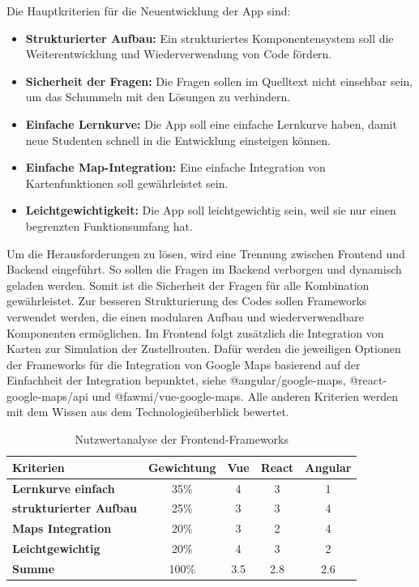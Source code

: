\documentclass[biblatex]{lni}
\begin{document}
Die Hauptkriterien für die Neuentwicklung der App sind:
\begin{itemize}
  \item \textbf{Strukturierter Aufbau:} Ein strukturiertes Komponentensystem soll die Weiterentwicklung und Wiederverwendung von Code fördern.
  \item \textbf{Sicherheit der Fragen:} Die Fragen sollen im Quelltext nicht einsehbar sein, um das Schummeln mit den Lösungen zu verhindern.
  \item \textbf{Einfache Lernkurve:} Die App soll eine einfache Lernkurve haben, damit neue Studenten schnell in die Entwicklung einsteigen können.
  \item \textbf{Einfache Map-Integration:} Eine einfache Integration von Kartenfunktionen soll gewährleistet sein.
  \item \textbf{Leichtgewichtigkeit:} Die App soll leichtgewichtig sein, weil sie nur einen begrenzten Funktionsumfang hat.
\end{itemize}

Um die Herausforderungen zu lösen, wird eine Trennung zwischen Frontend und Backend eingeführt.
So sollen die Fragen im Backend verborgen und dynamisch geladen werden.
Somit ist die Sicherheit der Fragen für alle Kombination gewährleistet.
Zur besseren Strukturierung des Codes sollen Frameworks verwendet werden, die einen modularen Aufbau und wiederverwendbare Komponenten ermöglichen.
Im Frontend folgt zusätzlich die Integration von Karten zur Simulation der Zustellrouten.
Dafür werden die jeweiligen Optionen der Frameworks für die Integration von Google Maps basierend auf der Einfachheit der Integration bepunktet,
siehe @angular/google-maps, @react-google-maps/api und @fawmi/vue-google-maps.
Alle anderen Kriterien werden mit dem Wissen aus dem Technologieüberblick bewertet.

\begin{table}[h!]
  \centering
  \caption{Nutzwertanalyse der Frontend-Frameworks}
  \label{tab:nutz-frontend}
  \begin{tabular}{@{}lcccc@{}}
    \toprule
    \textbf{Kriterien} & \textbf{Gewichtung} & \textbf{Vue} & \textbf{React} & \textbf{Angular} \\ \midrule
    \textbf{Lernkurve einfach} & 35\% & 4 & 3 & 1 \\ \midrule
    \textbf{strukturierter Aufbau} & 25\% & 3 & 3 & 4 \\ \midrule
    \textbf{Maps Integration} & 20\% & 3 & 2 & 4 \\ \midrule
    \textbf{Leichtgewichtig} & 20\% & 4 & 3 & 2 \\ \midrule
    \textbf{Summe} & 100\% & 3.5 & 2.8 & 2.6 \\ \bottomrule
  \end{tabular}
\end{table}
\end{document}
